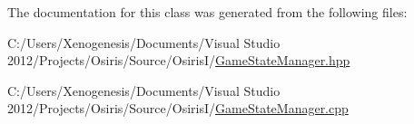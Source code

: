 The documentation for this class was generated from the following files\-:\begin{DoxyCompactItemize}
\item 
C\-:/\-Users/\-Xenogenesis/\-Documents/\-Visual Studio 2012/\-Projects/\-Osiris/\-Source/\-Osiris\-I/\hyperlink{_game_state_manager_8hpp}{Game\-State\-Manager.\-hpp}\item 
C\-:/\-Users/\-Xenogenesis/\-Documents/\-Visual Studio 2012/\-Projects/\-Osiris/\-Source/\-Osiris\-I/\hyperlink{_game_state_manager_8cpp}{Game\-State\-Manager.\-cpp}\end{DoxyCompactItemize}
